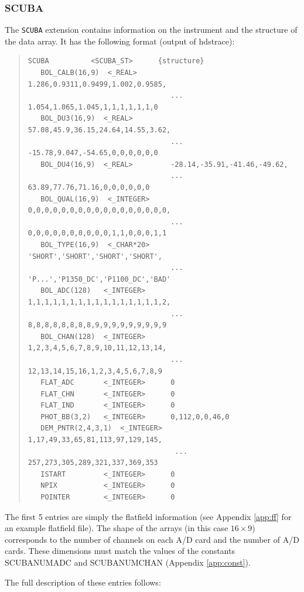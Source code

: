 \documentclass[twoside,11pt]{article}
\newenvironment{myquote}{\begin{quote}\begin{small}}{\end{small}\end{quote}}
\newcommand{\task}[1]{{\sf #1}}
\newcommand{\hdstrace}{\xref{\task{hdstrace}}{sun102}{}}
\newcommand{\xref}[3]{#1}
\renewcommand{\_}{\texttt{\symbol{95}}}
\begin{document}
\subsubsection{SCUBA}

The \texttt{SCUBA} extension contains information on the instrument and the
structure of the data array. It has the following format (output of
\hdstrace):

\begin{myquote}
\begin{verbatim}
SCUBA          <SCUBA_ST>      {structure}
   BOL_CALB(16,9)  <_REAL>        1.286,0.9311,0.9499,1.002,0.9585,
                                  ... 1.054,1.065,1.045,1,1,1,1,1,1,0
   BOL_DU3(16,9)  <_REAL>         57.08,45.9,36.15,24.64,14.55,3.62,
                                  ... -15.78,9.047,-54.65,0,0,0,0,0,0
   BOL_DU4(16,9)  <_REAL>         -28.14,-35.91,-41.46,-49.62,
                                  ... 63.89,77.76,71.16,0,0,0,0,0,0
   BOL_QUAL(16,9)  <_INTEGER>     0,0,0,0,0,0,0,0,0,0,0,0,0,0,0,0,0,
                                  ... 0,0,0,0,0,0,0,0,0,0,1,1,0,0,0,1,1
   BOL_TYPE(16,9)  <_CHAR*20>     'SHORT','SHORT','SHORT','SHORT',
                                  ... 'P...','P1350_DC','P1100_DC','BAD'
   BOL_ADC(128)   <_INTEGER>      1,1,1,1,1,1,1,1,1,1,1,1,1,1,1,1,2,
                                  ... 8,8,8,8,8,8,8,8,9,9,9,9,9,9,9,9,9
   BOL_CHAN(128)  <_INTEGER>      1,2,3,4,5,6,7,8,9,10,11,12,13,14,
                                  ... 12,13,14,15,16,1,2,3,4,5,6,7,8,9
   FLAT_ADC       <_INTEGER>      0
   FLAT_CHN       <_INTEGER>      0
   FLAT_IND       <_INTEGER>      0
   PHOT_BB(3,2)   <_INTEGER>      0,112,0,0,46,0
   DEM_PNTR(2,4,3,1)  <_INTEGER>   1,17,49,33,65,81,113,97,129,145,
                                   ... 257,273,305,289,321,337,369,353
   ISTART         <_INTEGER>      0
   NPIX           <_INTEGER>      0
   POINTER        <_INTEGER>      0
\end{verbatim}
\end{myquote}

The first 5 entries are simply the flatfield information (see Appendix
\ref{app:ff} for an example flatfield file). The shape of the arrays
(in this case $16\times9$) corresponds to the number of channels on each A/D
card and the number of A/D cards. These dimensions must match the values of
the constants SCUBA\_\_NUM\_ADC and SCUBA\_\_NUM\_CHAN (Appendix
\ref{app:const}).

The full description of these entries follows:
\end{document}
